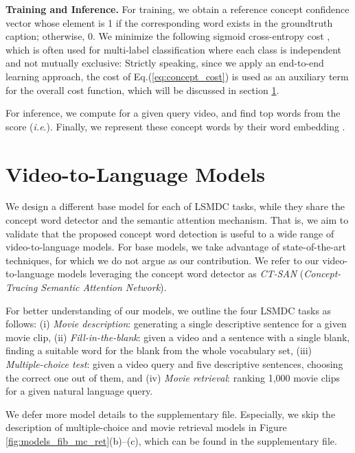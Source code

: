 \documentclass[10pt,twocolumn,letterpaper]{article}
\makeatletter
\theoremstyle{nonumberplain}
\DeclareRobustCommand\onedot{\futurelet\@let@token\@onedot}
\def\onedot{.\@\xspace}
\def\ie{\emph{i.e}\onedot} \def\Ie{\emph{I.e}\onedot}
\makeatother
\begin{document}
\medskip
\textbf{Training and Inference.}
For training, we obtain a reference concept confidence vector 
whose element  is 1 if the corresponding word exists in the groundtruth caption; otherwise, 0.
We minimize the following sigmoid cross-entropy cost ,
which is often used for multi-label classification \cite{wu-cvpr-2016} where each class is independent and not mutually exclusive:
Strictly speaking, since we apply an end-to-end learning approach,
the cost of Eq.(\ref{eq:concept_cost}) is used as an auxiliary term for the overall cost function, which will be discussed in section \ref{sec:v2l_models}.

For inference, we compute  for a given query video, and find top  words from the score  (\ie ).
Finally, we represent these  concept words by their word embedding .



\section{Video-to-Language Models}
\label{sec:v2l_models}

We design a different base model for each of LSMDC tasks, while they share the concept word detector and the semantic attention mechanism.
That is, we aim to validate that the proposed concept word detection is useful to a wide range of video-to-language models.
For base models, we take advantage of state-of-the-art techniques, for which we do not argue as our contribution.
We refer to our video-to-language models leveraging the concept word detector
as \emph{CT-SAN} (\emph{Concept-Tracing Semantic Attention Network}).

For better understanding of our models, we outline the four LSMDC tasks as follows:
(i) \textit{Movie description}: generating a single descriptive sentence for a given movie clip,
(ii) \textit{Fill-in-the-blank}: given a video and a sentence with a single blank, finding a suitable word for the blank from the whole vocabulary set,
(iii) \textit{Multiple-choice test}: given a video query and five descriptive sentences, choosing the correct one out of them, and
(iv) \textit{Movie retrieval}: ranking 1,000 movie clips for a given natural language query.

We defer more model details to the supplementary file.
Especially, we skip the description of multiple-choice and movie retrieval models in Figure \ref{fig:models_fib_mc_ret}(b)--(c),
which can be found in the supplementary file.
\end{document}
